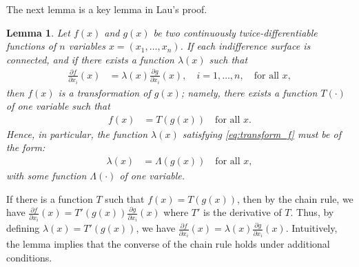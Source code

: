 \documentclass[11pt, a4paper]{article}
\newtheorem{lemma}{Lemma}
\begin{document}
The next lemma is a key lemma in Lau's proof.
\begin{lemma}\label{lemma_1_GU}
    Let $f(x)$ and $g(x)$ be two continuously twice-differentiable functions of $n$ variables $x=(x_1, \dots, x_n)$. If each indifference surface is connected, and if there exists a function $\lambda(x)$ such that
    \begin{align}
    \frac{\partial f}{\partial x_i}(x) &= \lambda(x)\frac{\partial g}{\partial x_i}(x), \quad i=1, \dots, n, \quad \text{for all } x, \label{eq:transform_f}
    \end{align}
    then $f(x)$ is a transformation of $g(x)$; namely, there exists a function $T(\cdot)$ of one variable such that
    \begin{align}
    f(x) &= T(g(x)) \quad \text{for all } x.
    \end{align}
    Hence, in particular, the function $\lambda(x)$ satisfying \eqref{eq:transform_f} must be of the form:
    \begin{align}
        \lambda(x) &= \Lambda(g(x)) \quad \text{for all } x, \label{eq:form_of_lambda}
    \end{align}
    with some function $\Lambda(\cdot)$ of one variable.
\end{lemma}
If there is a function $T$ such that $f(x) = T(g(x))$, then by the chain rule, we have $\frac{\partial f}{\partial x_i}(x) = T'(g(x))\frac{\partial g}{\partial x_i}(x)$ where $T'$ is the derivative of $T$.
Thus, by defining $\lambda(x) = T'(g(x))$, we have $\frac{\partial f}{\partial x_i}(x) = \lambda(x)\frac{\partial g}{\partial x_i}(x)$.
Intuitively, the lemma implies that the converse of the chain rule holds under additional conditions.
\end{document}
